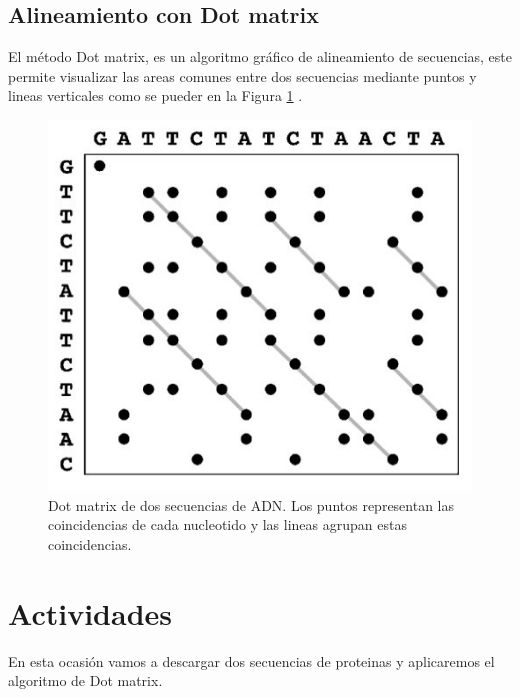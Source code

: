 \documentclass{article}
\begin{document}
\subsection{Alineamiento con Dot matrix}
El método Dot matrix, es un algoritmo gráfico de alineamiento de secuencias, este permite visualizar las areas comunes entre dos secuencias mediante puntos y lineas verticales como se pueder en la Figura  \ref{img:dot} \cite{xiong2006essential}.

\begin{figure}[h]
 \centering
    \includegraphics[width=\textwidth,height=0.2\textheight,keepaspectratio]{img/alignment/dot.jpg}
    \caption{Dot matrix de dos secuencias de ADN. Los puntos representan las coincidencias de cada nucleotido y las lineas agrupan estas coincidencias.}
    \label{img:dot}
\end{figure}


\section{Actividades}

En esta ocasión vamos a descargar dos secuencias de proteinas y aplicaremos el algoritmo de Dot matrix.
\end{document}
